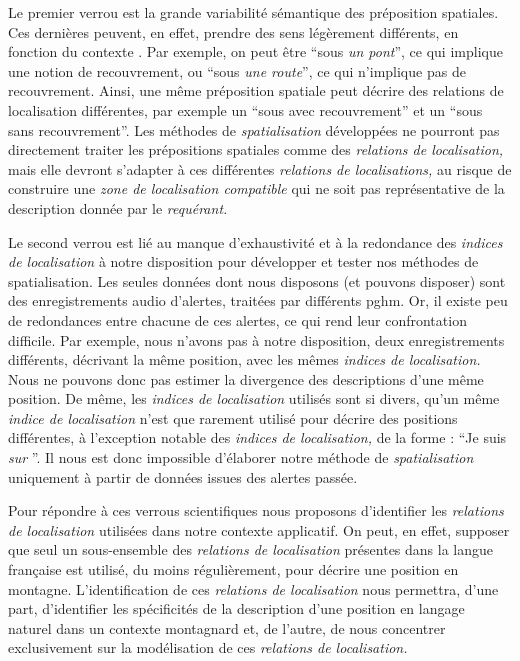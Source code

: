 Le premier verrou est la grande variabilité sémantique des préposition
spatiales. Ces dernières peuvent, en effet, prendre des sens
légèrement différents, en fonction du contexte
\autocite{Bateman2010}. Par exemple, on peut être \enquote{sous
  \emph{un pont}}, ce qui implique une notion de recouvrement, ou
\enquote{sous \emph{une route}}, ce qui n'implique pas de
recouvrement. Ainsi, une même préposition spatiale peut décrire des
relations de localisation différentes, par exemple un \enquote{sous
  avec recouvrement} et un \enquote{sous sans recouvrement}. Les
méthodes de \emph{spatialisation} développées ne pourront pas
directement traiter les prépositions spatiales comme des
\emph{relations de localisation,} mais elle devront s'adapter à ces
différentes \emph{relations de localisations,} au risque de construire
une \emph{zone de localisation compatible} qui ne soit pas
représentative de la description donnée par le \emph{requérant.}

Le second verrou est lié au manque d’exhaustivité et à la redondance
des \emph{indices de localisation} à notre disposition pour développer
et tester nos méthodes de spatialisation. Les seules données dont nous
disposons (et pouvons disposer) sont des enregistrements audio
d'alertes, traitées par différents \ac{pghm}. Or, il existe peu de
redondances entre chacune de ces alertes, ce qui rend leur
confrontation difficile. Par exemple, nous n'avons pas à notre
disposition, deux enregistrements différents, décrivant la même
position, avec les mêmes \emph{indices de localisation.} Nous ne
pouvons donc pas estimer la divergence des descriptions d'une même
position. De même, les \emph{indices de localisation} utilisés sont si
divers, qu'un même \emph{indice de localisation} n'est que rarement
utilisé pour décrire des positions différentes, à l'exception notable
des \emph{indices de localisation,} de la forme : \enquote{Je suis
  \emph{sur} }. Il
nous est donc impossible d’élaborer notre méthode de
\emph{spatialisation} uniquement à partir de données issues des
alertes passée.

Pour répondre à ces verrous scientifiques nous proposons d'identifier
les \emph{relations de localisation} utilisées dans notre contexte
applicatif. On peut, en effet, supposer que seul un sous-ensemble des
\emph{relations de localisation} présentes dans la langue française
est utilisé, du moins régulièrement, pour décrire une position en
montagne. L'identification de ces \emph{relations de localisation}
nous permettra, d'une part, d'identifier les spécificités de la
description d'une position en langage naturel dans un contexte
montagnard et, de l'autre, de nous concentrer exclusivement sur la
modélisation de ces \emph{relations de localisation.}


